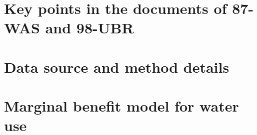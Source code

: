 \documentclass[preprint, 12pt]{elsarticle}
\begin{document}

\label{bib}

\newpage
\appendix\label{appendix}

\section{Key points in the documents of 87-WAS and 98-UBR}\label{secS1}
\renewcommand{\thefigure}{A\arabic{figure}}
\renewcommand{\thetable}{A\arabic{table}}
\setcounter{figure}{0}
\setcounter{table}{0}


\newpage
\section{Data source and method details}\label{secS2}
\renewcommand{\thefigure}{B\arabic{figure}}
\renewcommand{\thetable}{B\arabic{table}}
\setcounter{figure}{0}
\setcounter{table}{0}


% 

\newpage
\section{Marginal benefit model for water use}\label{secS4}
\renewcommand{\thefigure}{C\arabic{figure}}
\renewcommand{\thetable}{C\arabic{table}}
\setcounter{figure}{0}
\setcounter{table}{0}


% 
\end{document}

